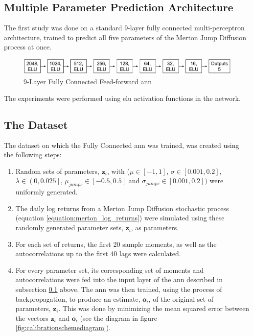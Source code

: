 \documentclass[11pt,oneside,openany,a4paper,english, report, goldenblock
]{usthesis}
\begin{document}
\subsection{Multiple Parameter Prediction Architecture} \label{subsection:fully_connected_ff_nn:architecture}
The first study was done on a standard 9-layer fully connected multi-perceptron architecture, trained to predict all five parameters of the Merton Jump Diffusion process at once.

\begin{figure}[h]
	\centering
	\includegraphics[width=1\linewidth]{Images/Diagrams/Network-Structures/MultipleOutputFullyConnectedANN}
	\caption[Multiple Output Prediction \acrshort{ann}]{9-Layer Fully Connected Feed-forward \acrshort{ann}}
	\label{fig:multipleoutputcnn}
\end{figure}

The experiments were performed using \acrshort{elu} activation functions in the network. 

\subsection{The Dataset}

The dataset on which the Fully Connected \acrshort{ann} was trained, was created using the following steps:
\begin{enumerate}[1)]
	\itemsep0em 
	\item  Random sets of parameters, $\mathbf{z}_i$, with ($\mu \in \left[-1, 1\right]$, $\sigma \in \left[0.001, 0.2\right]$, $\lambda \in \left(0, 0.025\right]$, $\mu_{jumps} \in \left[-0.5, 0.5\right]$ and $\sigma_{jumps} \in \left[0.001, 0.2\right])$ were uniformly generated.
	\item  The daily log returns from a Merton Jump Diffusion stochastic process (equation \ref{equation:merton_log_returns}) were simulated using these randomly generated parameter sets, $\mathbf{z}_i$, as parameters.
	\item  For each set of returns, the first 20 sample moments, as well as the autocorrelations up to the first 40 lags were calculated.
	\item For every parameter set, its corresponding set of moments and autocorrelations were fed into the input layer of the \acrshort{ann} described in subsection \ref{subsection:fully_connected_ff_nn:architecture} above. The \acrshort{ann} was then trained, using the process of backpropagation, to produce an estimate, $\mathbf{o}_i$, of the original set of parameters, $\mathbf{z}_i$. This was done by minimizing the mean squared error between the vectors $\mathbf{z}_i$ and $\mathbf{o}_i$ (see the diagram in figure \ref{fig:calibrationschemediagram}).
\end{enumerate}
\end{document}
